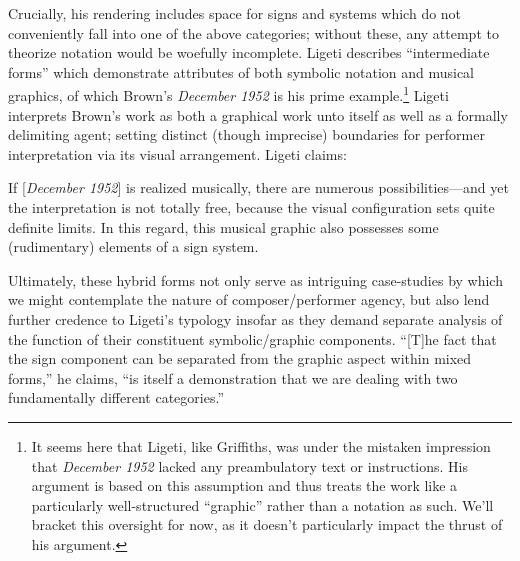 Crucially, his rendering includes space for signs and systems which do not conveniently fall into one of the above categories; without these, any attempt to theorize notation would be woefully incomplete. Ligeti describes ``intermediate forms'' which demonstrate attributes of both symbolic notation and musical graphics, of which Brown's \textit{December 1952} is his prime example.\footnote{It seems here that Ligeti, like Griffiths, was under the mistaken impression that \textit{December 1952} lacked any preambulatory text or instructions. His argument is based on this assumption and thus treats the work like a particularly well-structured ``graphic'' rather than a notation as such. We'll bracket this oversight for now, as it doesn't particularly impact the thrust of his argument.} Ligeti interprets Brown's work as both a graphical work unto itself as well as a formally delimiting agent; setting distinct (though imprecise) boundaries for performer interpretation via its visual arrangement. Ligeti claims:

\begin{smallquote}
    If [\textit{December 1952}] is realized musically, there are numerous possibilities---and yet the interpretation is not totally free, because the visual configuration sets quite definite limits. In this regard, this musical graphic also possesses some (rudimentary) elements of a sign system.\autocite[pg. 177 in Ernst et al., 1965.]{Ligeti_forthcoming}
\end{smallquote}

\noindent Ultimately, these hybrid forms not only serve as intriguing case-studies by which we might contemplate the nature of composer/performer agency, but also lend further credence to Ligeti's typology insofar as they demand separate analysis of the function of their constituent symbolic/graphic components. ``[T]he fact that the sign component can be separated from the graphic aspect within mixed forms,'' he claims, ``is itself a demonstration that we are dealing with two fundamentally different categories.''\autocite[pg. 177 in Ernst et al., 1965.]{Ligeti_forthcoming}


